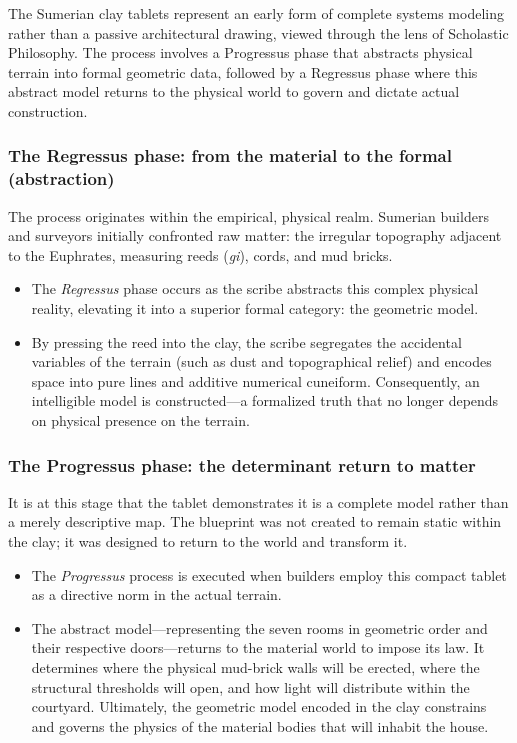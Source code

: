 \documentclass[11pt, a4paper]{article}
\begin{document}
The Sumerian clay tablets represent an early form of complete systems modeling rather than a passive architectural drawing, viewed through the lens of Scholastic Philosophy. The process involves a Progressus phase that abstracts physical terrain into formal geometric data, followed by a Regressus phase where this abstract model returns to the physical world to govern and dictate actual construction.
\subsubsection*{The Regressus phase: from the material to the formal (abstraction)}
The process originates within the empirical, physical realm. Sumerian builders and surveyors initially confronted raw matter: the irregular topography adjacent to the Euphrates, measuring reeds (\textit{gi}), cords, and mud bricks.
\begin{itemize}[leftmargin=*]
	\item The \textit{Regressus} phase occurs as the scribe abstracts this complex physical reality, elevating it into a superior formal category: the geometric model.
	\item By pressing the reed into the clay, the scribe segregates the accidental variables of the terrain (such as dust and topographical relief) and encodes space into pure lines and additive numerical cuneiform. Consequently, an intelligible model is constructed---a formalized truth that no longer depends on physical presence on the terrain.
\end{itemize}



\subsubsection*{The Progressus phase: the determinant return to matter}
It is at this stage that the tablet demonstrates it is a complete model rather than a merely descriptive map. The blueprint was not created to remain static within the clay; it was designed to return to the world and transform it.

\begin{itemize}[leftmargin=*]
	\item The \textit{Progressus} process is executed when builders employ this compact tablet as a directive norm in the actual terrain.
	\item The abstract model---representing the seven rooms in geometric order and their respective doors---returns to the material world to impose its law. It determines where the physical mud-brick walls will be erected, where the structural thresholds will open, and how light will distribute within the courtyard. Ultimately, the geometric model encoded in the clay constrains and governs the physics of the material bodies that will inhabit the house.
\end{itemize}
\end{document}

